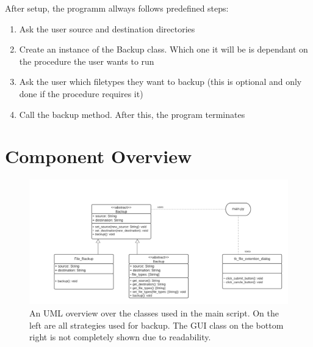 After setup, the programm allways follows predefined steps:

\begin{enumerate}
    \item Ask the user source and destination directories
    \item Create an instance of the Backup class. Which one it will be is dependant on the procedure the user wants to run
    \item Ask the user which filetypes they want to backup (this is optional and only done if the procedure requires it)
    \item Call the backup method. After this, the program terminates
\end{enumerate}

\section{Component Overview}

\begin{figure}[!ht]
    \centering
    \includegraphics[scale=.5]{IMG/2021_12_21_UML_model.png}
    \caption
    {
        An UML overview over the classes used in the main script.
        On the left are all strategies used for backup. 
        The GUI class on the bottom right is not completely shown due to readability.
    }
    \label{fig:UML_class_view}
\end{figure}